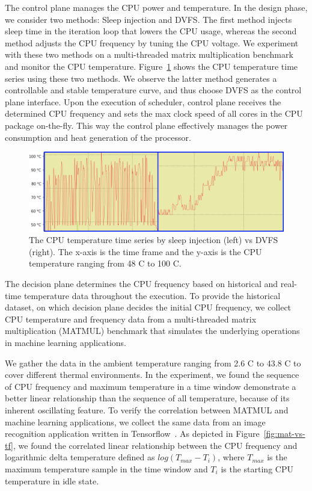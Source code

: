 The control plane manages the CPU power and temperature. In the design phase, we consider two methods: Sleep injection and DVFS. The first method injects sleep time in the iteration loop that lowers the CPU usage, whereas the second method adjusts the CPU frequency by tuning the CPU voltage. We experiment with these two methods on a multi-threaded matrix multiplication benchmark and monitor the CPU temperature. Figure~\ref{fig:sleep} shows the CPU temperature time series using these two methods. We observe the latter method generates a controllable and stable temperature curve, and thus choose DVFS as the control plane interface. Upon the execution of scheduler, control plane receives the determined CPU frequency and sets the max clock speed of all cores in the CPU package on-the-fly. This way the control plane effectively manages the power consumption and heat generation of the processor.

\begin{figure}[ht]
\includegraphics[width=\textwidth]{figures/Sleep-vs-dvfs.png}
\caption{The CPU temperature time series by sleep injection (left) vs DVFS (right). The x-axis is the time frame and the y-axis is the CPU temperature ranging from 48 \degree C to 100 \degree C. } \label{fig:sleep}
\end{figure}


The decision plane determines the CPU frequency based on historical and real-time temperature data throughout the execution. To provide the historical dataset, on which decision plane decides the initial CPU frequency, we collect CPU temperature and frequency data from a multi-threaded matrix multiplication (MATMUL) benchmark that simulates the underlying operations in machine learning applications. 

We gather the data in the ambient temperature ranging from 2.6 \degree C to 43.8 \degree C to cover different thermal environments. In the experiment, we found the sequence of CPU frequency and maximum temperature in a time window demonstrate a better linear relationship than the sequence of all temperature, because of its inherent oscillating feature. To verify the correlation between MATMUL and machine learning applications, we collect the same data from an image recognition application written in Tensorflow~\cite{ref:tensorflow}. As depicted in Figure~\ref{fig:mat-vs-tf}, we found the correlated linear relationship between the CPU frequency and logarithmic delta temperature defined as $log(T_{max} - T_i)$, where $T_{max}$ is the maximum temperature sample in the time window and $T_i$ is the starting CPU temperature in idle state. 
 
